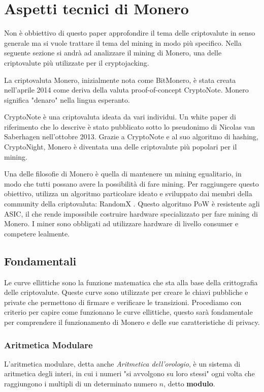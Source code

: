 \documentclass[12pt,a4paper]{article}
\begin{document}
\newpage 

\section{Aspetti tecnici di Monero}\label{sec:aspetti_tecnici} Non è obbiettivo
di questo paper approfondire il tema delle criptovalute in senso generale ma si
vuole trattare il tema del mining in modo più specifico. Nella seguente sezione
si andrà ad analizzare il mining di Monero, una delle criptovalute più
utilizzate per il cryptojacking.

La criptovaluta Monero, inizialmente nota come BitMonero, è stata creata
nell'aprile 2014 come deriva della valuta proof-of-concept CryptoNote. Monero
significa "denaro" nella lingua esperanto.

CryptoNote è una criptovaluta ideata da vari individui. Un white paper di
riferimento che lo descrive è stato pubblicato sotto lo pseudonimo di Nicolas
van Saberhagen nell'ottobre 2013. Grazie a CryptoNote e al suo algoritmo di
hashing, CryptoNight, Monero è diventata una delle criptovalute più popolari per
il mining.

Una delle filosofie di Monero è quella di mantenere un mining egualitario, in
modo che tutti possano avere la possibilità di fare mining. Per raggiungere
questo obiettivo, utilizza un algoritmo particolare ideato e sviluppato dai
membri della community della criptovaluta: RandomX . Questo algoritmo PoW è
resistente agli ASIC, il che rende impossibile costruire hardware specializzato
per fare mining di Monero. I miner sono obbligati ad utilizzare hardware di
livello consumer e competere lealmente.

\subsection{Fondamentali}
Le curve ellittiche sono la funzione matematica che sta alla base della
crittografia delle criptovalute. Queste curve sono utilizzate per creare le
chiavi pubbliche e private che permettono di firmare e verificare le
transizioni. Procediamo con criterio per capire come funzionano le curve
ellittiche, questo sarà fondamentale per comprendere il funzionamento di Monero
e delle sue caratteristiche di privacy.

\subsubsection{Aritmetica Modulare}
L'aritmetica modulare, detta anche \textit{Aritmetica dell'orologio}, è un
sistema di aritmetica degli interi, in cui i numeri "si avvolgono su loro
stessi" ogni volta che raggiungono i multipli di un determinato numero $ n $,
detto \textbf{modulo}.
\end{document}
